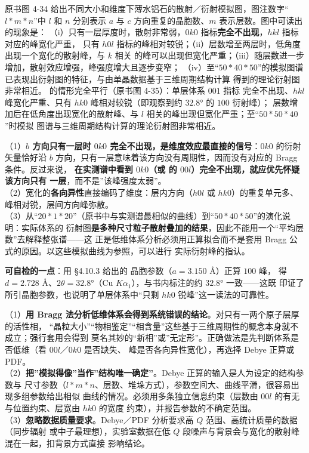\begin{example}
\begin{obs}
原书图 4-34 给出不同大小和维度下薄水铝石的散射／衍射模拟图，图注数字``$l*m*n$''中 $l$ 和
$n$ 分别表示 $a$ 与 $c$ 方向重复的晶胞数、$m$ 表示层数。图中可读出的现象是：
（i）只有一层厚度时，散射非常弱，$0k0$ 指标\textbf{完全不出现}，$hkl$ 指标对应的峰宽化严重，
只有 $h0l$ 指标的峰相对较锐；（ii）层数增至两层时，低角度出现一个宽化的散射峰，与 $k$ 相关
的峰可以出现但宽化严重；（iii）随层数进一步增加，散射效应增强，峰强度增大且逐步变窄；
（iv）至``$50*40*50$''的模拟图谱已表现出衍射图的特征，与由单晶数据基于三维周期结构计算
得到的理论衍射图非常相近。 的情形完全平行（原书图 4-35）：单层体系 $001$ 指标
完全不出现、$hkl$ 峰宽化严重、只有 $hk0$ 峰相对较锐（即观察到约 $32.8°$ 的 $100$ 衍射峰）；
层数增加后在低角度出现宽化的散射峰、与 $l$ 相关的峰出现但宽化严重；至``$50*50*40$''时模拟
图谱与三维周期结构计算的理论衍射图非常相近。
\end{obs}
\begin{infer}
（1）\textbf{$b$ 方向只有一层时 $0k0$ 完全不出现，是维度效应最直接的信号}：$0k0$ 的衍射
矢量恰好沿 $b$ 方向，只有一层意味着该方向没有周期性，因而没有对应的 Bragg 条件。反过来说，
\textbf{在实测谱中看到 $0k0$（或  的 $00l$）完全不出现，就应优先怀疑该方向只有
一层}，而不是''该峰强度太弱''。\\
（2）宽化的\textbf{各向异性}直接编码了维度：层内方向（$h0l$ 或 $hk0$）的重复单元多、
峰相对锐，层间方向峰弥散。\\
（3）从``$20*1*20$''（原书中与实测谱最相似的曲线）到``$50*40*50$''的演化说明：实际体系的
衍射图\textbf{是多种尺寸粒子散射叠加的结果}，因此不能用一个``平均层数''去解释整张谱——这
正是低维体系分析必须用正算拟合而不是套用 Bragg 公式的原因。以这些模拟曲线为参照，可以进行
实际衍射峰的指认。
\end{infer}
\textbf{可自检的一点}：用 §4.10.3 给出的  晶胞参数（$a=3.150$ Å）正算 $100$ 峰，
得 $d=2.728$ Å、$2\theta=32.8°$（Cu $K\alpha_{1}$），与书内标注的约 $32.8°$ 一致——这既
印证了所引晶胞参数，也说明了单层体系中``只剩 $hk0$ 锐峰''这一读法的可靠性。
\end{example}

\begin{pitfall}
（1）\textbf{用 Bragg 法分析低维体系会得到系统错误的结论}。对只有一两个原子层厚的活性相，
``晶粒大小''``物相鉴定''``相含量''这些基于三维周期性的概念本身就不成立；强行套用会得到
莫名其妙的``新相''或''无定形''。正确做法是先判断体系是否低维（看 $00l$／$0k0$ 是否缺失、
峰是否各向异性宽化），再选择 Debye 正算或 PDF。\\
（2）\textbf{把''模拟得像''当作''结构唯一确定''}。Debye 正算的输入是人为设定的结构参数与
尺寸参数（$l*m*n$、层数、堆垛方式），参数空间大、曲线平滑，很容易出现多组参数给出相似
曲线的情况。必须用多条独立信息约束（层数由 $00l$ 的有无与位置约束、层宽由 $hk0$ 的宽度
约束），并报告参数的不确定范围。\\
（3）\textbf{忽略数据质量要求}。Debye／PDF 分析要求高 $Q$ 范围、高统计质量的数据（同步辐射
或中子最理想），实验室数据在低 $Q$ 段噪声与背景会与宽化的散射峰混在一起，扣背景方式直接
影响结论。
\end{pitfall}


